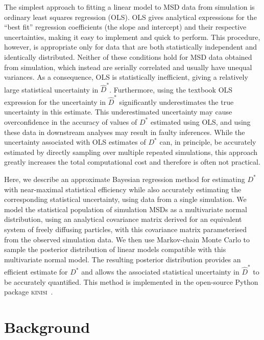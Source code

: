 \documentclass[reprint,superscriptaddress,nobibnotes,amsmath,amssymb,aps,prx,hidelinks]{revtex4-2}
\newcommand{\Dest}{\ensuremath{\widehat{D}^*}}
\newcommand{\D}{\ensuremath{D^*}}
\begin{document}
The simplest approach to fitting a linear model to MSD data from simulation is ordinary least squares regression (OLS).
OLS gives analytical expressions for the ``best fit'' regression coefficients (the slope and intercept) and their respective uncertainties, making it easy to implement and quick to perform.
This procedure, however, is appropriate only for data that are both statistically independent and identically distributed.
Neither of these conditions hold for MSD data obtained from simulation, which instead are serially correlated and usually have unequal variances.
As a consequence, OLS is statistically inefficient, giving a relatively large statistical uncertainty in $\Dest$.
Furthermore, using the textbook OLS expression for the uncertainty in $\Dest$ significantly underestimates the true uncertainty in this estimate.
This underestimated uncertainty may cause overconfidence in the accuracy of values of $\D$ estimated using OLS, and using these data in downstream analyses may result in faulty inferences.
While the uncertainty associated with OLS estimates of $\D$ can, in principle, be accurately estimated by directly sampling over multiple repeated simulations, this approach greatly increases the total computational cost and therefore is often not practical.

Here, we describe an approximate Bayesian regression method for estimating $\D$ with near-maximal statistical efficiency while also accurately estimating the corresponding statistical uncertainty, using data from a single simulation.
We model the statistical population of simulation MSDs as a multivariate normal distribution, using an analytical covariance matrix derived for an equivalent system of freely diffusing particles, with this covariance matrix parameterised from the observed simulation data.
We then use Markov-chain Monte Carlo to sample the posterior distribution of linear models compatible with this multivariate normal model.
The resulting posterior distribution provides an efficient estimate for $\D$ and allows the associated statistical uncertainty in $\Dest$ to be accurately quantified.
This method is implemented in the open-source Python package \textsc{kinisi}~\cite{mccluskey_kinisi_2022}.

\section{Background}
\end{document}
